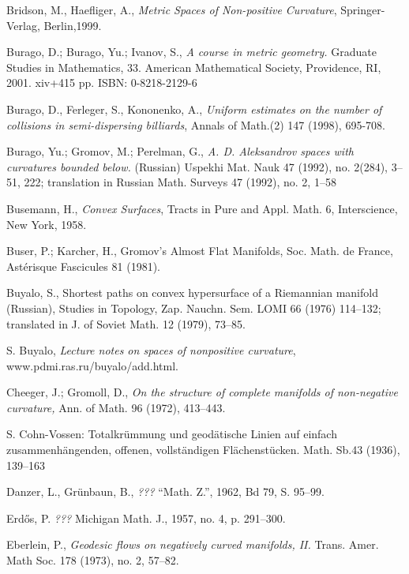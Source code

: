 \begin{thebibliography}{52}
Bridson, M., Haefliger, A.,
\textit{Metric Spaces of Non-positive Curvature},
Springer-Verlag, Berlin,1999.



 Burago, D.; Burago, Yu.; Ivanov, S., \textit{A course in metric geometry.} Graduate Studies in Mathematics, 33. American Mathematical Society, Providence, RI, 2001. xiv+415 pp. ISBN: 0-8218-2129-6

Burago, D., Ferleger, S., Kononenko, A.,
\textit{Uniform estimates on the number of collisions in semi-dispersing
billiards},
Annals of Math.(2) 147 (1998), 695-708.


 Burago, Yu.; Gromov, M.; Perelman, G., \textit{A. D. Aleksandrov spaces
with curvatures bounded below.} (Russian)  Uspekhi Mat. Nauk  47  (1992),  no.
2(284), 3--51, 222;  translation in  Russian Math. Surveys  47  (1992),  no. 2, 1--58

 Busemann, H., \textit{Convex Surfaces}, Tracts in Pure and Appl. Math. 6, Interscience, New York, 1958.

 Buser, P.; Karcher, H.,
Gromov's Almost Flat Manifolds,
Soc. Math. de France, Ast\'erisque Fascicules
81 (1981). 

 Buyalo, S., Shortest paths on convex
hypersurface of a Riemannian manifold (Russian), Studies in Topology, Zap. Nauchn. Sem.
LOMI 66 (1976) 114--132; translated in J. of Soviet Math. 12 (1979), 73--85.

S. Buyalo,
{\em Lecture notes on spaces of nonpositive curvature},
www.pdmi.ras.ru/buyalo/add.html.


  Cheeger, J.;  Gromoll, D., \textit{On the structure of complete manifolds of non-negative curvature,} Ann. of Math. 96 (1972), 413--443.


 S. Cohn-Vossen: Totalkr\"ummung und geod\"atische Linien auf einfach zusammenh\"angenden, offenen, vollst\"andigen Fl\"achenst\"ucken. Math. Sb.43 (1936), 139--163

Danzer, L., Gr\"unbaun, B., \textit{???} ``Math. Z.'',
1962, Bd 79, S. 95--99.

 Erd\H{o}s, P. \textit{???} Michigan Math. J., 1957, no. 4,
p. 291--300.

Eberlein, P., \textit{Geodesic flows on negatively curved manifolds, II.}  Trans. Amer. Math Soc. 178  (1973),  no. 2, 57--82.


\end{thebibliography}
